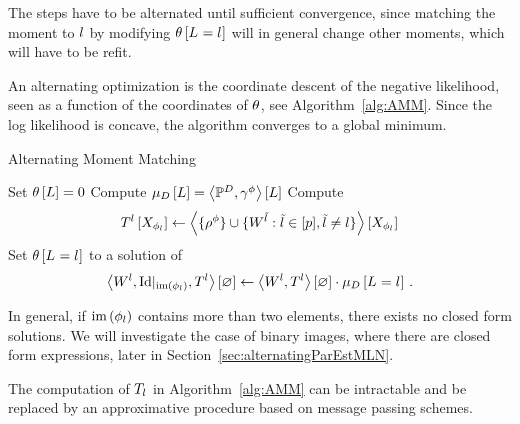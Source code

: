 The steps have to be alternated until sufficient convergence, since matching the moment to $l$ by modifying $\theta\left[L_{}=l_{}\right]$ will in general change other moments, which will have to be refit.


An alternating optimization is the coordinate descent of the negative likelihood, seen as a function of the coordinates of $\theta$, see Algorithm~\ref{alg:AMM}.
Since the log likelihood is concave, the algorithm converges to a global minimum.





\begin{algorithm}[h!]
\caption{Alternating Moment Matching}\label{alg:AMM}
\begin{algorithmic}
\State Set $\theta\left[L\right]=0$
\State Compute $\mu_{D}\left[L\right]= \left\langle \mathbb{P}^{D},\gamma^{\phi}\right\rangle \left[ L \right]$
{}
\For{$\selindexin$}
	\State Compute 
		\begin{align*}
			T^{l}\left[X_{\phi_{l}}\right] 
			\leftarrow \left\langle \{\rho^{\phi}\}\cup\{W^{\tilde{l}} : \tilde{l} \in [p], \tilde{l}\neq l\}\right\rangle \left[ X_{\phi_{l}} \right] 
		\end{align*}
	\State Set $\theta\left[L_{}=l_{}\right]$ to a solution of 
	\begin{align*}
		\left\langle W^{l},{\mathrm{Id}}|_{\mathrm{im}\left(\phi_{l}\right)},T^{l}\right\rangle \left[ \varnothing \right]
		\leftarrow \left\langle W^{l},T^{l}\right\rangle \left[ \varnothing \right] \cdot \mu_{D}\left[L_{}=l_{}\right] \, . 
	\end{align*}
\EndFor
\EndWhile
\end{algorithmic}
\end{algorithm}


% 
In general, if $\mathrm{im}\left(\phi_{l}\right)$ contains more than two elements, there exists no closed form solutions.
We will investigate the case of binary images, where there are closed form expressions, later in Section~\ref{sec:alternatingParEstMLN}.


%
The computation of $T_l$ in Algorithm~\ref{alg:AMM} can be intractable and be replaced by an approximative procedure based on message passing schemes.


